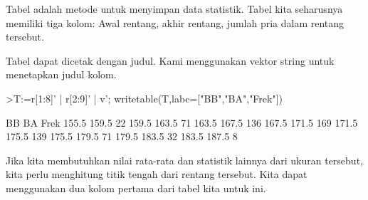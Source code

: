 \documentclass[12pt,arial,letterpaper]{book}
\begin{document}
\begin{eulercomment}
\begin{eulercomment}
\begin{eulercomment}
\begin{eulercomment}
\begin{eulercomment}
\begin{eulercomment}
\begin{eulercomment}
\begin{eulercomment}
\begin{eulercomment}
\begin{eulercomment}
\begin{eulercomment}
\begin{eulercomment}
\begin{eulercomment}
\begin{eulercomment}
\begin{eulercomment}
\begin{eulercomment}
\begin{eulercomment}
\begin{eulercomment}
\begin{eulercomment}
\begin{eulercomment}
\begin{eulercomment}
\begin{eulercomment}
\begin{eulercomment}
\begin{eulercomment}
\begin{eulercomment}
\begin{eulercomment}
\begin{eulercomment}
\begin{eulercomment}
\begin{eulercomment}
\begin{eulercomment}
\begin{eulercomment}
\begin{eulercomment}
\begin{eulercomment}
Tabel adalah metode untuk menyimpan data statistik. Tabel kita
seharusnya memiliki tiga kolom: Awal rentang, akhir rentang, jumlah
pria dalam rentang tersebut.

Tabel dapat dicetak dengan judul. Kami menggunakan vektor string untuk
menetapkan judul kolom.
\end{eulercomment}
\begin{eulerprompt}
>T:=r[1:8]' | r[2:9]' | v'; writetable(T,labc=["BB","BA","Frek"])
\end{eulerprompt}
\begin{euleroutput}
          BB        BA      Frek
       155.5     159.5        22
       159.5     163.5        71
       163.5     167.5       136
       167.5     171.5       169
       171.5     175.5       139
       175.5     179.5        71
       179.5     183.5        32
       183.5     187.5         8
\end{euleroutput}
\begin{eulercomment}
Jika kita membutuhkan nilai rata-rata dan statistik lainnya dari
ukuran tersebut, kita perlu menghitung titik tengah dari rentang
tersebut. Kita dapat menggunakan dua kolom pertama dari tabel kita
untuk ini.


\end{eulercomment}
\end{eulercomment}
\end{eulercomment}
\end{eulercomment}
\end{eulercomment}
\end{eulercomment}
\end{eulercomment}
\end{eulercomment}
\end{eulercomment}
\end{eulercomment}
\end{eulercomment}
\end{eulercomment}
\end{eulercomment}
\end{eulercomment}
\end{eulercomment}
\end{eulercomment}
\end{eulercomment}
\end{eulercomment}
\end{eulercomment}
\end{eulercomment}
\end{eulercomment}
\end{eulercomment}
\end{eulercomment}
\end{eulercomment}
\end{eulercomment}
\end{eulercomment}
\end{eulercomment}
\end{eulercomment}
\end{eulercomment}
\end{eulercomment}
\end{eulercomment}
\end{eulercomment}
\end{eulercomment}
\end{document}
